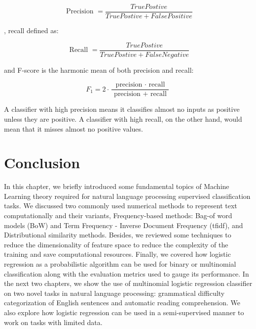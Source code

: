 $$\text { Precision } = \frac { True Postive } { True Postive + False Positive }$$

, recall defined as:

$$\text { Recall } = \frac { True Postive } { True Postive + False Negative }$$

and F-score is the harmonic mean of both precision and recall:

$$F _ { 1 } = 2 \cdot \frac { \text { precision } \cdot \text { recall } } { \text { precision } + \text { recall } }$$

A classifier with high precision means it classifies almost no inputs as positive unless they are positive. A classifier with high recall, on the other hand, would mean that  it misses almost no positive values. 
\section{Conclusion}

In this chapter, we briefly introduced some fundamental topics of Machine Learning theory required for natural language processing supervised classification tasks. We discussed two commonly used numerical methods to represent text computationally and their variants, Frequency-based methods: Bag-of word models (BoW) and Term Frequency - Inverse Document Frequency (tfidf), and Distributional similarity methods. Besides, we reviewed some techniques to reduce the dimensionality of feature space to reduce the complexity of the training and save computational resources. Finally, we covered how logistic regression as a probabilistic algorithm can be used for binary or multinomial classification along with the evaluation metrics used to gauge its performance. In the next two chapters, we show the use of multinomial logistic regression classifier on two novel tasks in natural language processing: grammatical difficulty categorization of English sentences and automatic reading comprehension. We also explore how logistic regression can be used in a semi-supervised manner to work on tasks with limited data. 